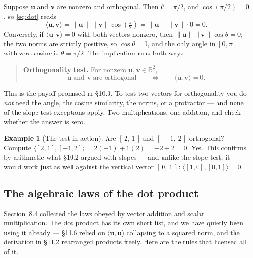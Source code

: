\documentclass[11pt]{article}
\theoremstyle{definition}
\newtheorem{ex}{Example}[section]
\theoremstyle{remark}
\newcommand{\R}{\mathbb{R}}
\newcommand{\vc}[1]{\mathbf{#1}}
\newcommand{\norm}[1]{\lVert #1\rVert}
\begin{document}
Suppose $\vc{u}$ and $\vc{v}$ are nonzero and orthogonal. Then $\theta=\pi/2$,
and $\cos(\pi/2)=0$, so \eqref{eq:dot} reads
\[
  \langle \vc{u},\vc{v}\rangle
  = \norm{\vc{u}}\,\norm{\vc{v}}\cos\!\left(\tfrac{\pi}{2}\right)
  = \norm{\vc{u}}\,\norm{\vc{v}}\cdot 0
  = 0 .
\]
Conversely, if $\langle\vc{u},\vc{v}\rangle=0$ with both vectors nonzero, then
$\norm{\vc{u}}\norm{\vc{v}}\cos\theta=0$; the two norms are strictly positive,
so $\cos\theta=0$, and the only angle in $[0,\pi]$ with zero cosine is
$\theta=\pi/2$. The implication runs both ways.

\begin{quote}
\textbf{Orthogonality test.} For nonzero $\vc{u},\vc{v}\in\R^{2}$,
\[
  \vc{u} \text{ and } \vc{v} \text{ are orthogonal}
  \qquad\Longleftrightarrow\qquad
  \langle \vc{u},\vc{v}\rangle = 0 .
\]
\end{quote}

\noindent This is the payoff promised in \S10.3. To test two vectors for
orthogonality you do \emph{not} need the angle, the cosine similarity, the
norms, or a protractor --- and none of the slope-test exceptions apply. Two
multiplications, one addition, and check whether the answer is zero.

\begin{ex}[The test in action]
Are $[\,2,\,1\,]$ and $[\,-1,\,2\,]$ orthogonal? Compute
$\langle[2,1],[-1,2]\rangle = 2(-1)+1(2) = -2+2 = 0$. Yes. This confirms by
arithmetic what \S10.2 argued with slopes --- and unlike the slope test, it
would work just as well against the vertical vector $[\,0,\,1\,]$:
$\langle[1,0],[0,1]\rangle = 0$.
\end{ex}

\subsection{The algebraic laws of the dot product}
Section~8.4 collected the laws obeyed by vector addition and scalar
multiplication. The dot product has its own short list, and we have quietly been
using it already --- \S11.6 relied on $\langle\vc{u},\vc{u}\rangle$ collapsing to
a squared norm, and the derivation in \S11.2 rearranged products freely. Here
are the rules that licensed all of it.
\end{document}
